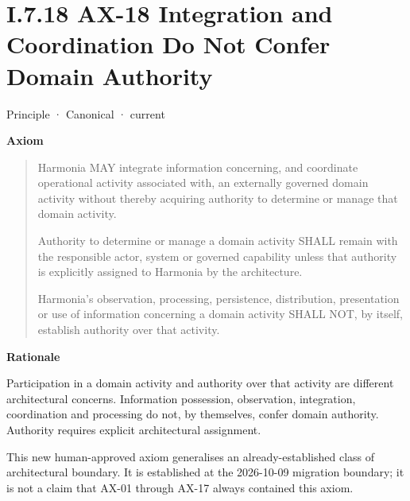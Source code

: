 \section*{I.7.18 AX-18 Integration and Coordination Do Not Confer Domain Authority}
\label{navigation:I.7.18}

\label{element:b8cafe3cf5904d2bb9a9767260fddf78}
{\small Principle · Canonical · current}\par

\par\medskip\textbf{Axiom}\par


\begin{quote}


Harmonia MAY integrate information concerning, and coordinate operational activity associated with, an externally governed domain activity without thereby acquiring authority to determine or manage that domain activity.



Authority to determine or manage a domain activity SHALL remain with the responsible actor, system or governed capability unless that authority is explicitly assigned to Harmonia by the architecture.



Harmonia's observation, processing, persistence, distribution, presentation or use of information concerning a domain activity SHALL NOT, by itself, establish authority over that activity.



\end{quote}


\par\medskip\textbf{Rationale}\par


Participation in a domain activity and authority over that activity are
different architectural concerns. Information possession, observation,
integration, coordination and processing do not, by themselves, confer
domain authority. Authority requires explicit architectural assignment.



This new human-approved axiom generalises an already-established class of
architectural boundary. It is established at the 2026-10-09 migration
boundary; it is not a claim that AX-01 through AX-17 always contained this
axiom.



